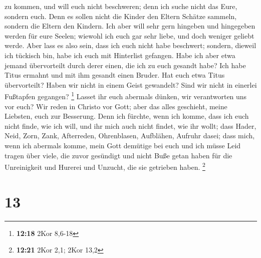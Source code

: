 zu kommen, und will euch nicht beschweren; denn ich suche nicht das
Eure, sondern euch. Denn es sollen nicht die Kinder den Eltern Schätze
sammeln, sondern die Eltern den Kindern.  Ich aber will
sehr gern hingeben und hingegeben werden für eure Seelen; wiewohl ich
euch gar sehr liebe, und doch weniger geliebt werde. 
Aber lass es also sein, dass ich euch nicht habe beschwert; sondern,
dieweil ich tückisch bin, habe ich euch mit Hinterlist gefangen.
 Habe ich aber etwa jemand übervorteilt durch derer
einen, die ich zu euch gesandt habe?  Ich habe Titus
ermahnt und mit ihm gesandt einen Bruder. Hat euch etwa Titus
übervorteilt? Haben wir nicht in einem Geist gewandelt? Sind wir nicht
in einerlei Fußtapfen gegangen? \footnote{\textbf{12:18} 2Kor 8,6-18}
 Lasset ihr euch abermals dünken, wir verantworten uns
vor euch? Wir reden in Christo vor Gott; aber das alles geschieht, meine
Liebsten, euch zur Besserung.  Denn ich fürchte, wenn ich
komme, dass ich euch nicht finde, wie ich will, und ihr mich auch nicht
findet, wie ihr wollt; dass Hader, Neid, Zorn, Zank, Afterreden,
Ohrenblasen, Aufblähen, Aufruhr dasei;  dass mich, wenn
ich abermals komme, mein Gott demütige bei euch und ich müsse Leid
tragen über viele, die zuvor gesündigt und nicht Buße getan haben für
die Unreinigkeit und Hurerei und Unzucht, die sie getrieben haben.
\footnote{\textbf{12:21} 2Kor 2,1; 2Kor 13,2}

\hypertarget{section-12}{%
\section{13}\label{section-12}}

